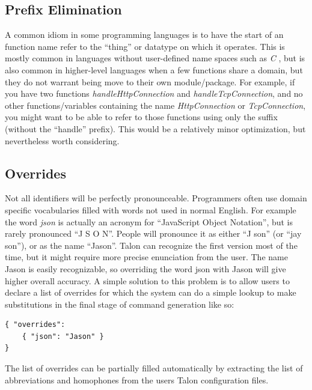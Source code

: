 \documentclass[../thesis.tex]{subfiles}
\begin{document}
\subsection{Prefix Elimination}\label{prefix_elimination}
A common idiom in some programming languages is to have the start of an function name refer to the ``thing''
or datatype on which it operates. This is mostly common in languages without user-defined name spaces such as \textit{C}
, but is also common in higher-level languages when a few functions share a domain, but they do not warrant
being move to their own module/package.
For example, if you have two functions \textit{handleHttpConnection} and \textit{handleTcpConnection}, and no other
functions/variables containing the name \textit{HttpConnection} or \textit{TcpConnection}, you might want to
be able to refer to those functions using only the suffix (without the ``handle'' prefix).
This would be a relatively minor optimization, but nevertheless worth considering.

\subsection{Overrides}\label{overrides}
Not all identifiers will be perfectly pronounceable.
Programmers often use domain specific vocabularies filled with words not used in normal English.
For example the word \textit{json} is actually an acronym for ``JavaScript Object Notation'', but is rarely
pronounced ``J S O N''.
People will pronounce it as either ``J son'' (or ``jay son''), or as the name ``Jason''.
Talon can recognize the first version most of the time, but it might require more precise enunciation from the user.
The name Jason is easily recognizable, so overriding the word json with Jason will give higher overall accuracy.
A simple solution to this problem is to allow users to declare a list of overrides for which the system
can do a simple lookup to make substitutions in the final stage of command generation like so:
\begin{verbatim}
{ "overrides": 
    { "json": "Jason" }
} 
\end{verbatim}
The list of overrides can be partially filled automatically by extracting the list of abbreviations and homophones
from the users Talon configuration files.



\end{document}
